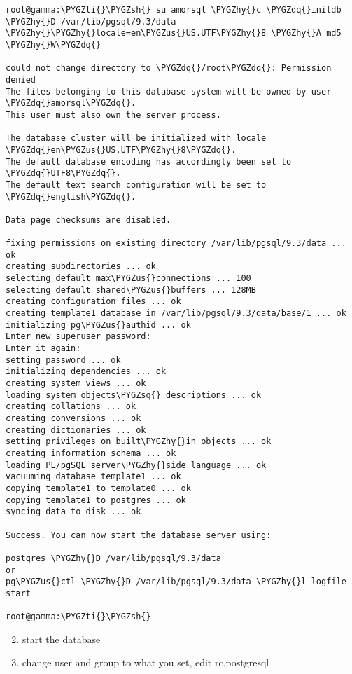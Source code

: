 \documentclass[letterpaper,10pt,english]{sphinxmanual}
\def\PYGZus{\char`\_}
\def\PYGZsh{\char`\#}
\def\PYGZhy{\char`\-}
\def\PYGZsq{\char`\'}
\def\PYGZdq{\char`\"}
\def\PYGZti{\char`\~}
\begin{document}
\begin{Verbatim}[commandchars=\\\{\}]
root@gamma:\PYGZti{}\PYGZsh{} su amorsql \PYGZhy{}c \PYGZdq{}initdb \PYGZhy{}D /var/lib/pgsql/9.3/data \PYGZhy{}\PYGZhy{}locale=en\PYGZus{}US.UTF\PYGZhy{}8 \PYGZhy{}A md5 \PYGZhy{}W\PYGZdq{} 

could not change directory to \PYGZdq{}/root\PYGZdq{}: Permission denied
The files belonging to this database system will be owned by user \PYGZdq{}amorsql\PYGZdq{}.
This user must also own the server process.

The database cluster will be initialized with locale \PYGZdq{}en\PYGZus{}US.UTF\PYGZhy{}8\PYGZdq{}.
The default database encoding has accordingly been set to \PYGZdq{}UTF8\PYGZdq{}.
The default text search configuration will be set to \PYGZdq{}english\PYGZdq{}.

Data page checksums are disabled.

fixing permissions on existing directory /var/lib/pgsql/9.3/data ... ok
creating subdirectories ... ok
selecting default max\PYGZus{}connections ... 100
selecting default shared\PYGZus{}buffers ... 128MB
creating configuration files ... ok
creating template1 database in /var/lib/pgsql/9.3/data/base/1 ... ok
initializing pg\PYGZus{}authid ... ok
Enter new superuser password: 
Enter it again: 
setting password ... ok
initializing dependencies ... ok
creating system views ... ok
loading system objects\PYGZsq{} descriptions ... ok
creating collations ... ok
creating conversions ... ok
creating dictionaries ... ok
setting privileges on built\PYGZhy{}in objects ... ok
creating information schema ... ok
loading PL/pgSQL server\PYGZhy{}side language ... ok
vacuuming database template1 ... ok
copying template1 to template0 ... ok
copying template1 to postgres ... ok
syncing data to disk ... ok

Success. You can now start the database server using:

postgres \PYGZhy{}D /var/lib/pgsql/9.3/data
or
pg\PYGZus{}ctl \PYGZhy{}D /var/lib/pgsql/9.3/data \PYGZhy{}l logfile start

root@gamma:\PYGZti{}\PYGZsh{}
\end{Verbatim}
\begin{enumerate}
\setcounter{enumi}{1}
\item {} 
start the database

\item {} 
change user and group to what you set, edit rc.postgresql

\end{enumerate}
\end{document}
